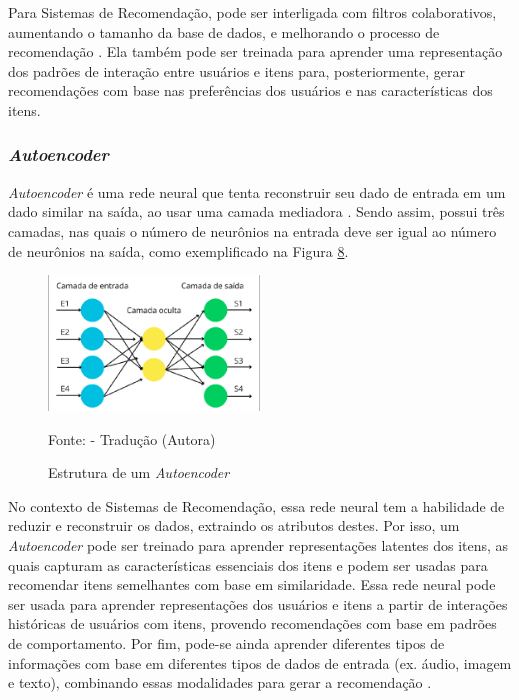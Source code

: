 Para Sistemas de Recomendação, pode ser interligada com filtros colaborativos, aumentando o tamanho da base de dados, e
melhorando o processo de recomendação \cite{elSisi2020}. Ela também pode ser treinada para aprender uma representação
dos padrões de interação entre usuários e itens para, posteriormente, gerar recomendações com base nas preferências dos
usuários e nas características dos itens.

\subsubsection{\textit{Autoencoder}}\label{subsubsec:autoencoder}
\textit{Autoencoder} é uma rede neural que tenta reconstruir seu dado de entrada em um dado similar na saída, ao usar uma
camada mediadora \cite{elSisi2020}. Sendo assim, possui três camadas, nas quais o número de neurônios na entrada deve ser igual ao número de
neurônios na saída, como exemplificado na Figura \hyperref[fig:autoencoder]{8}.

\begin{figure}[H]
    \centering
    \caption{Estrutura de um \textit{Autoencoder}}
    \label{fig:autoencoder}
    
    \vspace{2pt} %
    
    \includegraphics[width=0.5\textwidth]{figuras/autoencoder2.eps}
    
    \vspace{2pt} %
    
    \small Fonte: \cite{elSisi2020} - Tradução (Autora)
\end{figure}

No contexto de Sistemas de Recomendação, essa rede neural tem a habilidade de reduzir e reconstruir os dados, extraindo os 
atributos destes. Por isso, um \textit{Autoencoder} pode ser treinado para aprender representações latentes dos itens, as 
quais capturam as características
essenciais dos itens e podem ser usadas para recomendar itens semelhantes com base em similaridade. Essa rede neural pode ser 
usada para aprender representações dos usuários e itens a partir de interações históricas de usuários com itens, provendo
recomendações com base em padrões de comportamento. Por fim, pode-se ainda aprender diferentes tipos de informações com
base em diferentes tipos de dados de entrada (ex. áudio, imagem e texto), combinando essas modalidades para gerar a recomendação \cite{zhang2020autoencoder}.

